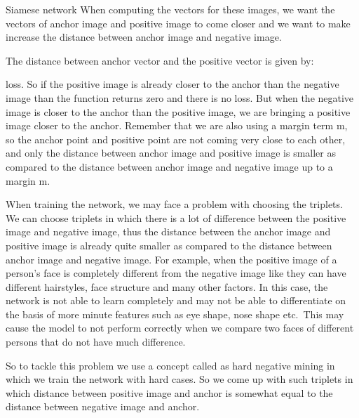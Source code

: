 Siamese network When computing the vectors for these images, we want the
vectors of anchor image and positive image to come closer and we want to make
increase the distance between anchor image and negative image.

The distance between anchor vector and the positive vector is given by:




loss. So if the positive image is already closer to the anchor than the negative
image than the function returns zero and there is no loss. But when the negative
image is closer to the anchor than the positive image, we are bringing a
positive image closer to the anchor. Remember that we are also using a margin
term m, so the anchor point and positive point are not coming very close to each
other, and only the distance between anchor image and positive image is smaller
as compared to the distance between anchor image and negative image up to a
margin m.

When training the network, we may face a problem with choosing the triplets. We
can choose triplets in which there is a lot of difference between the positive
image and negative image, thus the distance between the anchor image and
positive image is already quite smaller as compared to the distance between
anchor image and negative image. For example, when the positive image of a
person's face is completely different from the negative image like they can have
different hairstyles, face structure and many other factors. In this case, the
network is not able to learn completely and may not be able to differentiate on
the basis of more minute features such as eye shape, nose shape etc.\ This may
cause the model to not perform correctly when we compare two faces of different
persons that do not have much difference.

So to tackle this problem we use a concept called as hard negative mining in
which we train the network with hard cases. So we come up with such triplets in
which distance between positive image and anchor is somewhat equal to the
distance between negative image and anchor.
